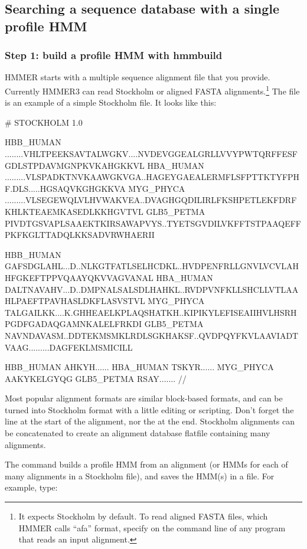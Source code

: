 \subsection{Searching a sequence database with a single profile HMM}

\subsubsection{Step 1: build a profile HMM with hmmbuild}

HMMER starts with a multiple sequence alignment file that you
provide. Currently HMMER3 can read Stockholm or aligned FASTA
alignments.\footnote{It expects Stockholm by default. To read aligned
  FASTA files, which HMMER calls ``afa'' format, specify
   on the command line of any program that reads
  an input alignment.} The file  is an
example of a simple Stockholm file. It looks like this:

\begin{sreoutput}
# STOCKHOLM 1.0

HBB_HUMAN   ........VHLTPEEKSAVTALWGKV....NVDEVGGEALGRLLVVYPWTQRFFESFGDLSTPDAVMGNPKVKAHGKKVL
HBA_HUMAN   .........VLSPADKTNVKAAWGKVGA..HAGEYGAEALERMFLSFPTTKTYFPHF.DLS.....HGSAQVKGHGKKVA
MYG_PHYCA   .........VLSEGEWQLVLHVWAKVEA..DVAGHGQDILIRLFKSHPETLEKFDRFKHLKTEAEMKASEDLKKHGVTVL
GLB5_PETMA  PIVDTGSVAPLSAAEKTKIRSAWAPVYS..TYETSGVDILVKFFTSTPAAQEFFPKFKGLTTADQLKKSADVRWHAERII

HBB_HUMAN   GAFSDGLAHL...D..NLKGTFATLSELHCDKL..HVDPENFRLLGNVLVCVLAHHFGKEFTPPVQAAYQKVVAGVANAL
HBA_HUMAN   DALTNAVAHV...D..DMPNALSALSDLHAHKL..RVDPVNFKLLSHCLLVTLAAHLPAEFTPAVHASLDKFLASVSTVL
MYG_PHYCA   TALGAILKK....K.GHHEAELKPLAQSHATKH..KIPIKYLEFISEAIIHVLHSRHPGDFGADAQGAMNKALELFRKDI
GLB5_PETMA  NAVNDAVASM..DDTEKMSMKLRDLSGKHAKSF..QVDPQYFKVLAAVIADTVAAG.........DAGFEKLMSMICILL

HBB_HUMAN   AHKYH......
HBA_HUMAN   TSKYR......
MYG_PHYCA   AAKYKELGYQG
GLB5_PETMA  RSAY.......
//
\end{sreoutput}

Most popular alignment formats are similar block-based formats, and
can be turned into Stockholm format with a little editing or
scripting. Don't forget the  line at the start
of the alignment, nor the \prog{//} at the end. Stockholm alignments
can be concatenated to create an alignment database flatfile
containing many alignments.

The  command builds a profile HMM from an alignment (or
HMMs for each of many alignments in a Stockholm file), and saves the
HMM(s) in a file. For example, type:

